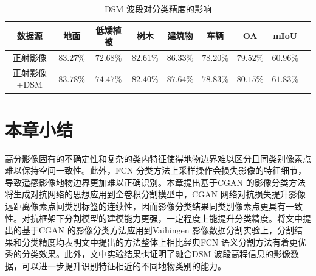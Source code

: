 \begin{table}[htbp]
  \caption{DSM 波段对分类精度的影响}\label{tab:dsm_affect}
  \centering
  \begin{tabular}{ccccccccc}
    \toprule
    数据源       & 地面      & 低矮植被  & 树木      & 建筑物    & 车辆      & OA        & mIoU               \\
    \midrule
    正射影像     & $83.27\%$ & $72.68\%$ & $82.61\%$ & $86.33\%$ & $78.20\%$ & $79.52\%$ & $60.96\%$          \\
    正射影像+DSM & $83.78\%$ & $74.47\%$ & $82.40\%$ & $87.64\%$ & $78.83\%$ & $80.15\%$ & \textbf{$61.83\%$} \\
    \bottomrule
  \end{tabular}
\end{table}

\section{本章小结}
\label{sec:forth}
高分影像固有的不确定性和复杂的类内特征使得地物边界难以区分且同类别像素点难以保持空间一致性。此外，FCN 分类方法上采样操作会损失影像的特征细节，导致遥感影像地物边界更加难以正确识别。本章提出基于CGAN 的影像分类方法将生成对抗网络的思想应用到全卷积分割模型中，CGAN 网络对抗损失提升影像远距离像素点间类别标签的连续性，因而影像分类结果同类别像素点更具有一致性。对抗框架下分割模型的建模能力更强，一定程度上能提升分类精度。将文中提出的基于CGAN 的影像分类方法应用到Vaihingen 影像数据分割实验上，分割结果和分类精度均表明文中提出的方法整体上相比经典FCN 语义分割方法有着更优秀的分类效果。此外，文中实验结果也证明了融合DSM 波段高程信息的影像数据，可以进一步提升识别特征相近的不同地物类别的能力。

